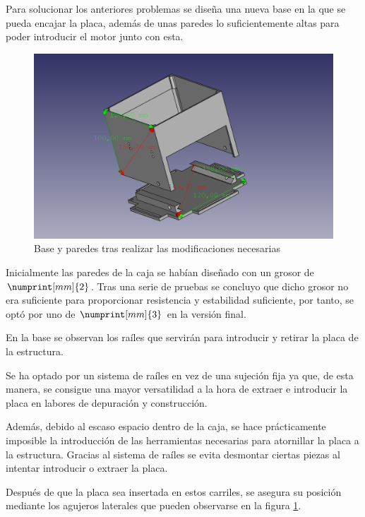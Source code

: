 Para solucionar los anteriores problemas se diseña una nueva base en la que se pueda encajar la placa, además de unas paredes lo suficientemente altas para poder introducir el motor junto con esta.

 \begin{figure}[H]
    \centering
    \includegraphics[width=.9\linewidth]{pictures/paredesybasenuevas.png}
    \caption{Base y paredes tras realizar las modificaciones necesarias}
    \label{fig:placa_y_paredes_nuevas}
\end{figure}

Inicialmente las paredes de la caja se habían diseñado con un grosor de $\numprint[mm]{2}$. Tras una serie de pruebas se concluyo que dicho grosor no era suficiente para proporcionar resistencia y estabilidad suficiente, por tanto, se optó por uno de $\numprint[mm]{3}$ en la versión final.

En la base se observan los raíles que servirán para introducir y retirar la placa de la estructura. 

Se ha optado por un sistema de raíles en vez de una sujeción fija ya que, de esta manera, se consigue una mayor versatilidad a la hora de extraer e introducir la placa en labores de depuración y construcción. 

Además, debido al escaso espacio dentro de la caja, se hace prácticamente imposible la introducción de las herramientas necesarias para atornillar la placa a la estructura. Gracias al sistema de raíles se evita desmontar ciertas piezas al intentar introducir o extraer la placa.

Después de que la placa sea insertada en estos carriles, se asegura su posición mediante los agujeros laterales que pueden observarse en la figura \ref{fig:placa_y_paredes_nuevas}.


